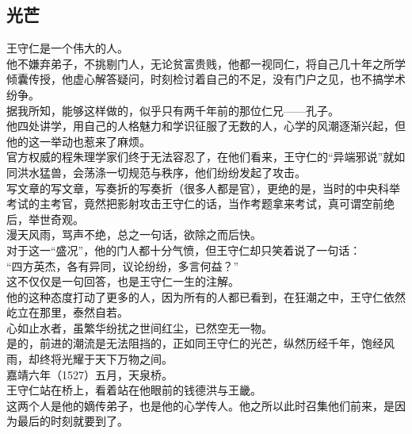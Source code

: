 \begin{multicols}{\theparacolNo}
\subsection{光芒}
王守仁是一个伟大的人。\\

他不嫌弃弟子，不挑剔门人，无论贫富贵贱，他都一视同仁，将自己几十年之所学倾囊传授，他虚心解答疑问，时刻检讨着自己的不足，没有门户之见，也不搞学术纷争。\\

据我所知，能够这样做的，似乎只有两千年前的那位仁兄——孔子。\\

他四处讲学，用自己的人格魅力和学识征服了无数的人，心学的风潮逐渐兴起，但他的这一举动也惹来了麻烦。\\

官方权威的程朱理学家们终于无法容忍了，在他们看来，王守仁的“异端邪说”就如同洪水猛兽，会荡涤一切规范与秩序，他们纷纷发起了攻击。\\

写文章的写文章，写奏折的写奏折（很多人都是官），更绝的是，当时的中央科举考试的主考官，竟然把影射攻击王守仁的话，当作考题拿来考试，真可谓空前绝后，举世奇观。\\

漫天风雨，骂声不绝，总之一句话，欲除之而后快。\\

对于这一“盛况”，他的门人都十分气愤，但王守仁却只笑着说了一句话：\\

“四方英杰，各有异同，议论纷纷，多言何益？”\\

这不仅仅是一句回答，也是王守仁一生的注解。\\

他的这种态度打动了更多的人，因为所有的人都已看到，在狂潮之中，王守仁依然屹立在那里，泰然自若。\\

心如止水者，虽繁华纷扰之世间红尘，已然空无一物。\\

是的，前进的潮流是无法阻挡的，正如同王守仁的光芒，纵然历经千年，饱经风雨，却终将光耀于天下万物之间。\\

嘉靖六年（1527）五月，天泉桥。\\

王守仁站在桥上，看着站在他眼前的钱德洪与王畿。\\

这两个人是他的嫡传弟子，也是他的心学传人。他之所以此时召集他们前来，是因为最后的时刻就要到了。\\


\end{multicols}
